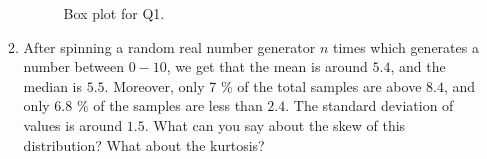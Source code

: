 \documentclass[12pt, oneside]{article}
\begin{document}
\begin{enumerate}
\begin{enumerate}
\begin{figure}[!ht]
        \caption{\label{fig:1} Box plot for Q1.}
    \end{figure}
    \item After spinning a random real number generator $n$ times which generates a number between $0-10$, we get that the mean is around $5.4$, and the median is $5.5$. Moreover, only 7 \% of the total samples are above $8.4$, and only 6.8 \% of the samples are less than $2.4$. The standard deviation of values is around $1.5$. What can you say about the skew of this distribution? What about the kurtosis?   
\end{enumerate}


\end{enumerate}
\end{document}

